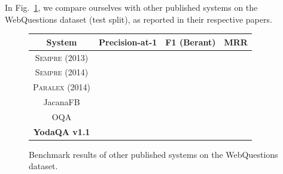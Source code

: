 In Fig.~\ref{fig:wqbench}, we compare ourselves with other published systems
on the WebQuestions dataset (test split), as reported in their respective papers.

\begin{figure}[t]
\centering
\begin{tabular}{|c|ccc|}
\hline
System & Precision-at-1 & F1 (Berant) & MRR \\ \hline
\textsc{Sempre} (2013) & & & \\
\textsc{Sempre} (2014) & & & \\
\textsc{Paralex} (2014) & & & \\
JacanaFB & & & \\
OQA \citep{OQA} & & & \\ \hline
\textbf{YodaQA v1.1} & & & \\
\hline
\end{tabular}
\vspace*{-0.2cm}
\caption{Benchmark results of other published systems on the WebQuestions dataset.}
\label{fig:wqbench}
\end{figure}

